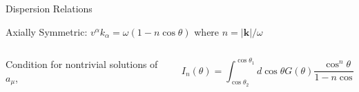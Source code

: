 \begin{frame}{Dispersion Relations}


\begin{tcolorbox}[standard jigsaw, opacityback=0, coltext=white]
Axially Symmetric: $v^\alpha k_\alpha = \omega (1 - n \cos \theta)$ where $n = \lvert \boldsymbol{k} \rvert / \omega $
\end{tcolorbox}

\begin{columns}[T]
    \begin{column}{0.5\textwidth}
Condition for nontrivial solutions of $a_\mu$,




\end{column}

\begin{column}{0.5\textwidth}




   \begin{equation*}
      I_n(\theta)=\int_{\cos\theta_2}^{\cos\theta_1} d\cos\theta G(\theta) \frac{\cos^n\theta}{1 - n \cos\theta }
   \end{equation*}





\end{column}
\end{columns}
\end{frame}
